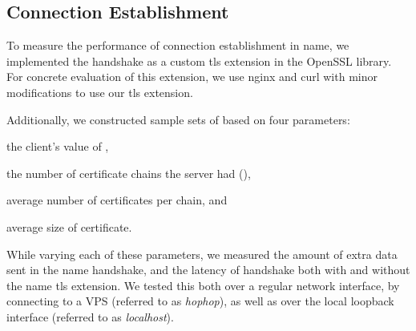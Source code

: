 
\subsection{Connection Establishment}
\label{sec:evaluation:performance}


To measure the performance of connection establishment in \ac{name},
we implemented the handshake as a custom \ac{tls} extension in the
OpenSSL library. For concrete evaluation of this extension, we use
nginx and curl with minor modifications to use our \ac{tls} extension.

Additionally, we constructed sample sets of  based
on four parameters:
\begin{inparaenum}
\item the client's value of \numlas,
\item the number of certificate chains the server had (\policy),
\item average number of certificates per chain, and
\item average size of certificate.
\end{inparaenum}
While varying each of these parameters, we measured the amount of
extra data sent in the \ac{name} handshake, and the latency of
handshake both with and without the \ac{name} \ac{tls} extension. We
tested this both over a regular network interface, by connecting to a
VPS (referred to as \emph{hophop}), as well as over the local loopback
interface (referred to as \emph{localhost}).

